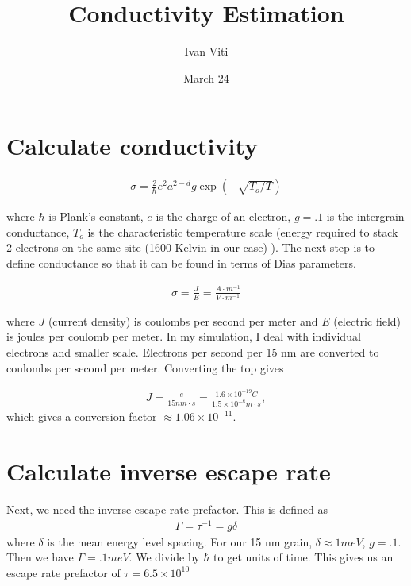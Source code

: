 \documentclass[11pt]{article}
\title{\textbf{Conductivity Estimation}}
\author{Ivan Viti}
\date{March 24}
\begin{document}
\maketitle

\section{Calculate conductivity}

\begin{eqnarray}
\sigma = \frac{2} {\hbar} e^2 a^{2-d} g \exp(-\sqrt{T_o / T})
\label{conductanceGlatz}
\end{eqnarray}

	where $\hbar$ is Plank's constant, $e$ is the charge of an electron, $g = .1$ is the intergrain conductance, $T_o$ is the characteristic temperature scale (energy required to stack 2 electrons on the same site (1600 Kelvin in our case) ). The next step is to define conductance so that it can be found in terms of Dias parameters.
	
 \begin{eqnarray}
\sigma = \frac{J} {E} = \frac {A \cdot m^{-1}} {V \cdot m^{-1}} 
\label{conductanceWiki}
\end{eqnarray}

where $J$ (current density) is coulombs per second per meter and $E$ (electric field) is joules per coulomb per meter. In my simulation, I deal with individual electrons and smaller scale. Electrons per second per 15 nm are converted to coulombs per second per meter. Converting the top gives

\begin{eqnarray}
J = \frac {e} {15nm \cdot s} = \frac{ 1.6\times 10^{-19} C} {1.5\times 10^{-8} m \cdot s}  , 
\label{convertJ}
\end{eqnarray}
which gives a conversion factor $\approx 1.06 \times 10^{-11} $.

\section{Calculate inverse escape rate}
Next, we need the inverse escape rate prefactor. This is defined as
\begin{eqnarray}
\Gamma = \tau^{-1} = g \delta 
\label{escapeRate}
\end{eqnarray}
where $\delta$ is the mean energy level spacing. For our 15 nm grain, $\delta \approx 1 meV$, $g = .1$. Then we have $\Gamma = .1 meV$. We divide by $\hbar$ to get units of time. This gives us an escape rate prefactor of $\tau = 6.5\times 10^{10}$ 
\end{document}
